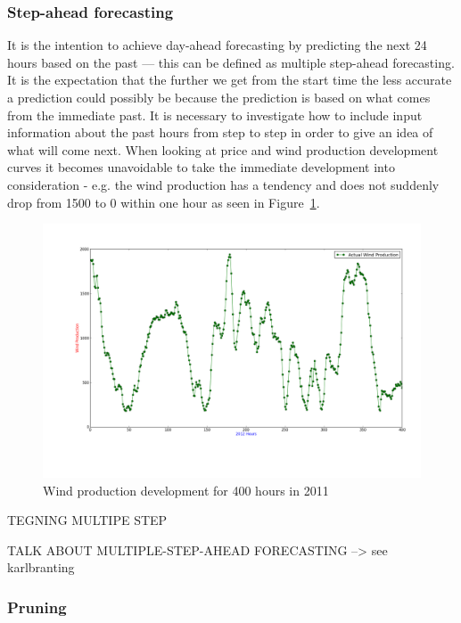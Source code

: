 \subsubsection{Step-ahead forecasting}
It is the intention to achieve day-ahead forecasting by predicting the next 24 hours based on the past --- this can be defined as multiple step-ahead forecasting\cite{FIND REF}. It is the expectation that the further we get from the start time the less accurate a prediction could possibly be because the prediction is based on what comes from the immediate past. It is necessary to investigate how to include input information about the past hours from step to step in order to give an idea of what will come next. When looking at price and wind production development curves it becomes unavoidable to take the immediate development into consideration - e.g. the wind production has a tendency and does not suddenly drop from 1500 to 0 within one hour as seen in Figure~\ref{fig:windHourDevelopment400Hours}.

\begin{figure}[H]
\centering
\includegraphics[width=0.99\linewidth,natwidth=898,natheight=587]{billeder/productionTendency400Hours.png}
\caption{Wind production development for 400 hours in 2011}
\label{fig:windHourDevelopment400Hours}
\end{figure}


TEGNING MULTIPE STEP

TALK ABOUT MULTIPLE-STEP-AHEAD FORECASTING --> see karlbranting

\subsubsection{Pruning}